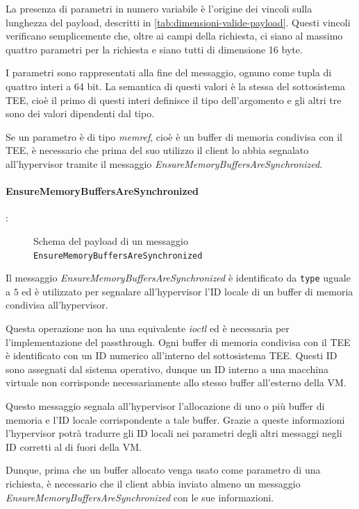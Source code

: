 \documentclass[12pt,italian]{report}
\begin{document}
La presenza di parametri in numero variabile è l'origine dei vincoli
sulla lunghezza del payload, descritti in \ref{tab:dimensioni-valide-payload}.
Questi vincoli verificano semplicemente che, oltre ai campi della
richiesta, ci siano al massimo quattro parametri per la richiesta e siano
tutti di dimensione 16 byte.

I parametri sono rappresentati alla fine del messaggio, ognuno come tupla
di quattro interi a 64 bit.
La semantica di questi valori è la stessa del sottosistema TEE, cioè il
primo di questi interi definisce il tipo dell'argomento e gli
altri tre sono dei valori dipendenti dal tipo.

Se un parametro è di tipo \textit{memref}, cioè è un buffer di memoria
condivisa con il TEE, è necessario che prima del suo utilizzo il client
lo abbia segnalato all'hypervisor tramite il messaggio
\textit{EnsureMemoryBuffersAreSynchronized}.

\paragraph{EnsureMemoryBuffersAreSynchronized}: \\
\begin{figure}[H]
    \centering
    \caption{Schema del payload di un messaggio \texttt{EnsureMemoryBuffersAreSynchronized}}
    \label{fig:msg-schema-embas}
\end{figure}
Il messaggio \textit{EnsureMemoryBuffersAreSynchronized} è identificato da
\texttt{type} uguale a $5$ ed è utilizzato per segnalare all'hypervisor
l'ID locale di un buffer di memoria condivisa all'hypervisor.

Questa operazione non ha una equivalente \textit{ioctl} ed è necessaria
per l'implementazione del passthrough.
Ogni buffer di memoria condivisa con il TEE è identificato con un ID numerico
all'interno del sottosistema TEE.
Questi ID sono assegnati dal sistema operativo, dunque un ID interno a una
macchina virtuale non corrisponde necessariamente allo stesso buffer
all'esterno della VM.

Questo messaggio segnala all'hypervisor l'allocazione di uno o più buffer di
memoria e l'ID locale corrispondente a tale buffer.
Grazie a queste informazioni l'hypervisor potrà tradurre gli ID locali nei
parametri degli altri messaggi negli ID corretti al di fuori della VM.

Dunque, prima che un buffer allocato venga usato come parametro di una
richiesta,
è necessario che il client abbia inviato almeno un messaggio
\textit{EnsureMemoryBuffersAreSynchronized} con le sue informazioni.
\end{document}
